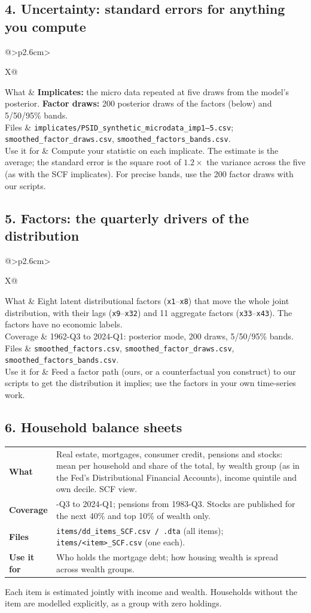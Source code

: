 \documentclass[11pt]{article}
\makeatletter
\newcommand{\file}[1]{\texttt{#1}}
\newenvironment{product}[1]{\subsection*{#1}}{}
\newcommand{\facts}[1]{\begin{tabularx}{\linewidth}{@{}>{\bfseries}p{2.6cm}>{\raggedright\arraybackslash}X@{}}#1\end{tabularx}\par\vspace{3pt}}
\makeatother
\begin{document}
\begin{product}{4. Uncertainty: standard errors for anything you compute}
\facts{
What & \textbf{Implicates:} the micro data repeated at five draws from the model's posterior.
       \textbf{Factor draws:} 200 posterior draws of the factors (below) and 5/50/95\% bands. \\
Files & \file{implicates/PSID\_synthetic\_microdata\_imp1--5.csv};
        \file{smoothed\_factor\_draws.csv}, \file{smoothed\_factors\_bands.csv}. \\
Use it for & Compute your statistic on each implicate. The estimate is the average; the standard error is
             the square root of $1.2\times$ the variance across the five (as with the SCF implicates).
             For precise bands, use the 200 factor draws with our scripts. \\
}
\end{product}

\begin{product}{5. Factors: the quarterly drivers of the distribution}
\facts{
What & Eight latent distributional factors (\file{x1}--\file{x8}) that move the whole joint distribution,
       with their lags (\file{x9}--\file{x32}) and 11 aggregate factors (\file{x33}--\file{x43}).
       The factors have no economic labels. \\
Coverage & 1962-Q3 to 2024-Q1: posterior mode, 200 draws, 5/50/95\% bands. \\
Files & \file{smoothed\_factors.csv}, \file{smoothed\_factor\_draws.csv},
        \file{smoothed\_factors\_bands.csv}. \\
Use it for & Feed a factor path (ours, or a counterfactual you construct) to our scripts to get the
             distribution it implies; use the factors in your own time-series work. \\
}
\end{product}

\begin{product}{6. Household balance sheets}
\facts{
What & Real estate, mortgages, consumer credit, pensions and stocks: mean per household and share of the
       total, by wealth group (as in the Fed's Distributional Financial Accounts), income quintile and
       own decile. SCF view. \\
Coverage & 1962-Q3 to 2024-Q1; pensions from 1983-Q3. Stocks are published for the next 40\% and top
           10\% of wealth only. \\
Files & \file{items/dd\_items\_SCF.csv / .dta} (all items); \file{items/<item>\_SCF.csv} (one each). \\
Use it for & Who holds the mortgage debt; how housing wealth is spread across wealth groups. \\
}
Each item is estimated jointly with income and wealth. Households without the item are modelled
explicitly, as a group with zero holdings.
\end{product}
\end{document}
